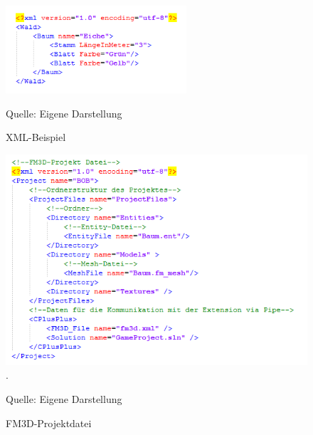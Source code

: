 \begin{figure}
	\begin{center}
		\includegraphics[width=0.6\textwidth]{03unserprogramm/Designer/xmlbsp.png}
		\caption{XML-Beispiel}\label{xmlbsp}
		Quelle: Eigene Darstellung
	\end{center}
\end{figure}
\begin{figure}
	\begin{center}
		\includegraphics[width=\textwidth]{03unserprogramm/Designer/FM3DProjektdatei.PNG}.
		\caption{FM3D-Projektdatei}\label{fm3dprojekt}
		Quelle: Eigene Darstellung
	\end{center}
\end{figure}
%